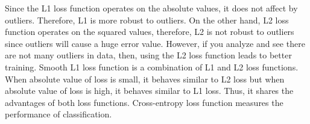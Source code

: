 \documentclass{article}
\begin{document}
Since the L1 loss function operates on the absolute values, it does not 
affect by outliers. Therefore, L1 is more robust to outliers. On the
other hand, L2 loss function operates on the squared values, therefore, 
L2 is not robust to outliers since outliers will cause a huge error value. 
However, if you analyze and see there are not many outliers in data, then, 
using the L2 loss function leads to better training. Smooth L1 loss function is a 
combination of L1 and L2 loss functions. When absolute value of loss is small, it 
behaves similar to L2 loss but when absolute value of loss is high, it behaves 
similar to L1 loss. Thus, it shares the advantages of both loss functions. Cross-entropy 
loss function measures the performance of classification. 
\end{document}
